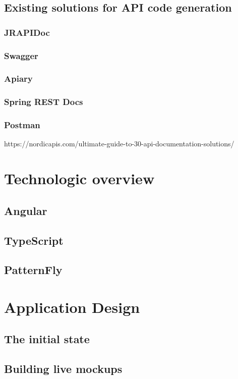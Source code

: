 \section{Existing solutions for API code generation}
\subsection{JRAPIDoc}
\subsection{Swagger}
\subsection{Apiary}
\subsection{Spring REST Docs}
\subsection{Postman}
https://nordicapis.com/ultimate-guide-to-30-api-documentation-solutions/

\chapter{Technologic overview}
\label{technology}
\section{Angular}
\section{TypeScript}
\section{PatternFly}

\chapter{Application Design}
\label{design}
\section{The initial state}
\section{Building live mockups}

